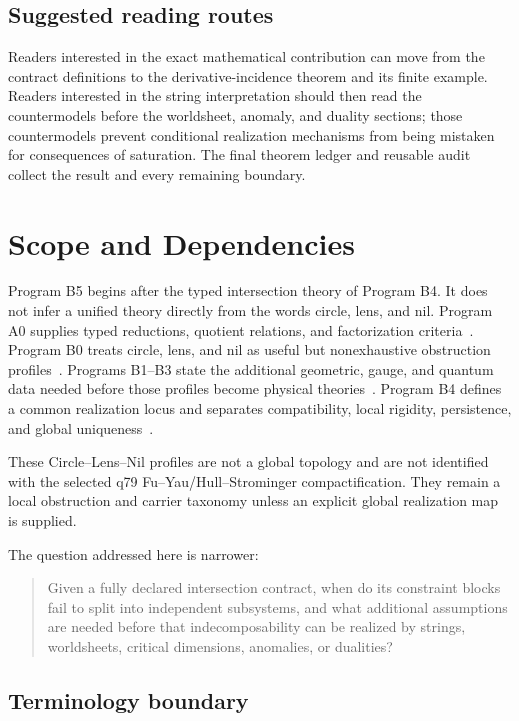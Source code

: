 \documentclass[11pt]{article}
\begin{document}
\subsection{Suggested reading routes}

Readers interested in the exact mathematical contribution can move from the
contract definitions to the derivative-incidence theorem and its finite
example.  Readers interested in the string interpretation should then read
the countermodels before the worldsheet, anomaly, and duality sections; those
countermodels prevent conditional realization mechanisms from being mistaken
for consequences of saturation.  The final theorem ledger and reusable audit
collect the result and every remaining boundary.

\section{Scope and Dependencies}

Program B5 begins after the typed intersection theory of Program B4.  It does
not infer a unified theory directly from the words circle, lens, and nil.
Program A0 supplies typed reductions, quotient relations, and factorization
criteria~\cite{A0}.  Program B0 treats circle, lens, and nil as useful but
nonexhaustive obstruction profiles~\cite{B0}.  Programs B1--B3 state the
additional geometric, gauge, and quantum data needed before those profiles
become physical theories~\cite{B1,B2,B3}.  Program B4 defines a common
realization locus and separates compatibility, local rigidity, persistence,
and global uniqueness~\cite{B4}.

These Circle--Lens--Nil profiles are not a global topology and are not
identified with the selected q79 Fu--Yau/Hull--Strominger compactification.
They remain a local obstruction and carrier taxonomy unless an explicit
global realization map is supplied.

The question addressed here is narrower:
\begin{quote}
Given a fully declared intersection contract, when do its constraint blocks
fail to split into independent subsystems, and what additional assumptions are
needed before that indecomposability can be realized by strings, worldsheets,
critical dimensions, anomalies, or dualities?
\end{quote}

\subsection{Terminology boundary}
\end{document}
